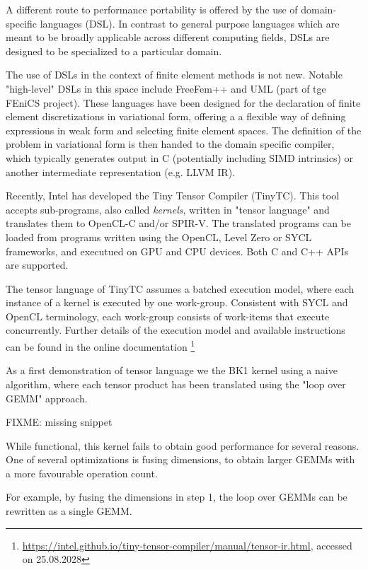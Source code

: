 \documentclass[a4paper,12pt]{article}
\begin{document}
\label{sec:tinytc}

A different route to performance portability is offered by the use of domain-specific languages (DSL). In contrast to general purpose languages which are meant to be broadly applicable across different computing fields, DSLs are designed to be specialized to a particular domain.

The use of DSLs in the context of finite element methods is not new.
Notable "high-level" DSLs in this space include FreeFem++ and UML (part of tge FEniCS project).
These languages have been designed for the declaration of finite element discretizations in variational form, offering a 
a flexible way of defining expressions in weak form and selecting finite element spaces. 
The definition of the problem in variational form is then handed to the domain specific compiler, which typically generates output in C (potentially including SIMD intrinsics) or another intermediate representation (e.g. LLVM IR). 

Recently, Intel has developed the Tiny Tensor Compiler (TinyTC).
This tool accepts sub-programs, also called \textit{kernels}, written in "tensor language" and translates them to OpenCL-C and/or SPIR-V. 
The translated programs can be loaded from programs written using the OpenCL, Level Zero or SYCL frameworks, 
and executued on GPU and CPU devices.
Both C and C++ APIs are supported.

The tensor language of TinyTC assumes a batched execution model, where each instance of a kernel is executed by one work-group. Consistent with SYCL and OpenCL terminology, each work-group consists of work-items that execute concurrently. Further details of the execution model and available instructions can be found in the online documentation \footnote{\url{https://intel.github.io/tiny-tensor-compiler/manual/tensor-ir.html}, accessed on 25.08.2028}

As a first demonstration of tensor language we the BK1 kernel using a naive algorithm, where
each tensor product has been translated using the "loop over GEMM" approach. 

FIXME: missing snippet

While functional, this kernel fails to obtain good performance for several reasons.
One of several optimizations is fusing dimensions, to obtain larger GEMMs with a more favourable operation count. 

For example, by fusing the dimensions in step 1, the loop over GEMMs can be rewritten as a single GEMM.
\end{document}
